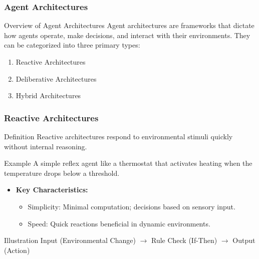 \documentclass[aspectratio=169]{beamer}
\begin{document}
\begin{frame}[fragile]
    \frametitle{Agent Architectures}
    \begin{block}{Overview of Agent Architectures}
        Agent architectures are frameworks that dictate how agents operate, make decisions, and interact with their environments. They can be categorized into three primary types:
    \end{block}
    \begin{enumerate}
        \item Reactive Architectures
        \item Deliberative Architectures
        \item Hybrid Architectures
    \end{enumerate}
\end{frame}

\begin{frame}[fragile]
    \frametitle{Reactive Architectures}
    \begin{block}{Definition}
        Reactive architectures respond to environmental stimuli quickly without internal reasoning.
    \end{block}
    \begin{exampleblock}{Example}
        A simple reflex agent like a thermostat that activates heating when the temperature drops below a threshold.
    \end{exampleblock}
    \begin{itemize}
        \item \textbf{Key Characteristics:}
        \begin{itemize}
            \item Simplicity: Minimal computation; decisions based on sensory input.
            \item Speed: Quick reactions beneficial in dynamic environments.
        \end{itemize}
    \end{itemize}
    \begin{block}{Illustration}
        Input (Environmental Change) $\rightarrow$ Rule Check (If-Then) $\rightarrow$ Output (Action)
    \end{block}
\end{frame}
\end{document}
